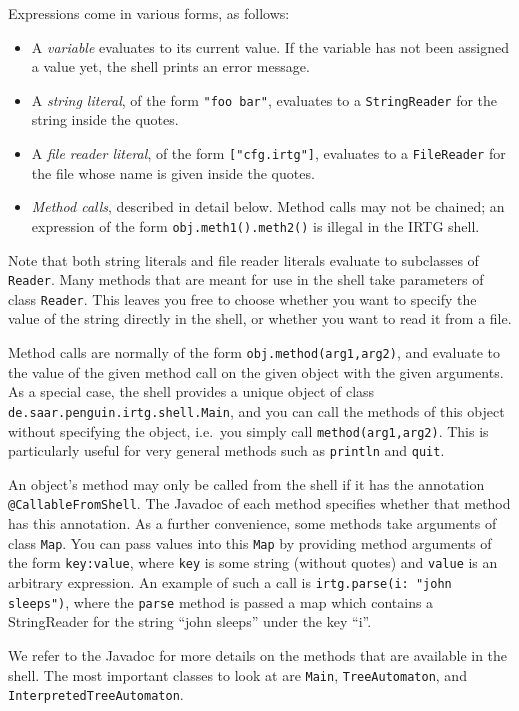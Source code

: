\documentclass[11pt]{article}
\begin{document}
Expressions come in various forms, as follows:
\begin{itemize}
\item A \emph{variable} evaluates to its current value. If the
  variable has not been assigned a value yet, the shell prints an
  error message.
\item A \emph{string literal}, of the form \verb?"foo bar"?, evaluates
  to a \verb?StringReader? for the string inside the quotes. 
\item A \emph{file reader literal}, of the form \verb?["cfg.irtg"]?,
  evaluates to a \verb?FileReader? for the file whose name is given
  inside the quotes.
\item \emph{Method calls}, described in detail below. Method
  calls may not be chained; an expression of the form
  \verb?obj.meth1().meth2()? is illegal in the IRTG shell.
\end{itemize}

Note that both string literals and file reader literals evaluate to
subclasses of \verb?Reader?.  Many methods that are meant for use in
the shell take parameters of class \verb?Reader?.  This leaves you
free to choose whether you want to specify the value of the string
directly in the shell, or whether you want to read it from a file.

Method calls are normally of the form \verb?obj.method(arg1,arg2)?,
and evaluate to the value of the given method call on the given object
with the given arguments.  As a special case, the shell provides a
unique object of class \verb?de.saar.penguin.irtg.shell.Main?, and you
can call the methods of this object without specifying the object,
i.e.\ you simply call \verb?method(arg1,arg2)?.  This is particularly
useful for very general methods such as \verb?println? and
\verb?quit?.

An object's method may only be called from the shell if it has the
annotation \verb?@CallableFromShell?.  The Javadoc of each method
specifies whether that method has this annotation.  As a further
convenience, some methods take arguments of class \verb?Map?.  You can
pass values into this \verb?Map? by providing method arguments of the
form \verb?key:value?, where \verb?key? is some string (without
quotes) and \verb?value? is an arbitrary expression.  An example of
such a call is \verb?irtg.parse(i: "john sleeps")?, where the
\verb?parse? method is passed a map which contains a StringReader for
the string ``john sleeps'' under the key ``i''.

We refer to the Javadoc for more details on the methods that are
available in the shell.  The most important classes to look at are
\verb?Main?, \verb?TreeAutomaton?, and
\verb?InterpretedTreeAutomaton?.
\end{document}
